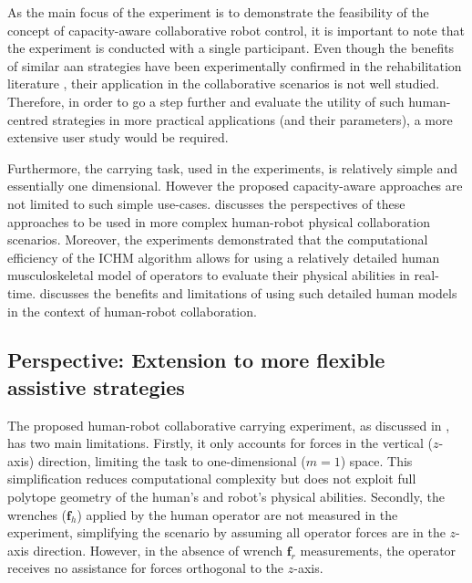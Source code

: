 As the main focus of the experiment is to demonstrate the feasibility of the concept of capacity-aware collaborative robot control, it is important to note that the experiment is conducted with a single participant.
Even though the benefits of similar \gls{aan} strategies have been experimentally confirmed in the rehabilitation literature \cite{Carmichael2013Experimental, petric2019assistive}, their application in the collaborative scenarios is not well studied. Therefore, in order to go a step further and evaluate the utility of such human-centred strategies in more practical applications (and their parameters), a more extensive user study would be required. 

Furthermore, the carrying task, used in the experiments, is relatively simple and essentially one dimensional. However the proposed capacity-aware approaches are not limited to such simple use-cases.  discusses the perspectives of these approaches to be used in more complex human-robot physical collaboration scenarios. 
Moreover, the experiments demonstrated that the computational efficiency of the ICHM algorithm allows for using a relatively detailed human musculoskeletal model of operators to evaluate their physical abilities in real-time.  discusses the benefits and limitations of using such detailed human models in the context of human-robot collaboration.


\subsection{Perspective: Extension to more flexible assistive strategies}
\label{sec:advanced_collaboraiton_discussion}

The proposed human-robot collaborative carrying experiment, as discussed in , has two main limitations. Firstly, it only accounts for forces in the vertical ($z$-axis) direction, limiting the task to one-dimensional ($m=1$) space. This simplification reduces computational complexity but does not exploit full polytope geometry of the human's and robot's physical abilities. Secondly, the wrenches ($\bm{f}_h$) applied by the human operator are not measured in the experiment, simplifying the scenario by assuming all operator forces are in the $z$-axis direction. However, in the absence of wrench $\bm{f}_r$ measurements, the operator receives no assistance for forces orthogonal to the $z$-axis. 

